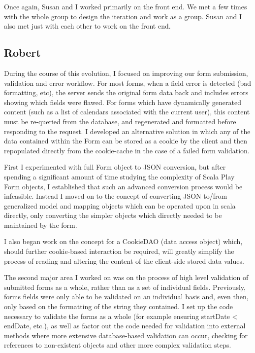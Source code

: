 \documentclass{article}
\begin{document}
Once again, Susan and I worked primarily on the front end.  We met a few times with the whole group to design the iteration and work as a group.  Susan and I also met just with each other to work on the front end.  


\subsection{Robert}
During the course of this evolution, I focused on improving our form submission, validation and error workflow. For most forms, when a field error is detected (bad formatting, etc), the server sends the original form data back and includes errors showing which fields were flawed. For forms which have dynamically generated content (such as a list of calendars associated with the current user), this content must be re-queried from the database, and regenerated and formatted before responding to the request. I developed an alternative solution in which any of the data contained within the Form can be stored as a cookie by the client and then repopulated directly from the cookie-cache in the case of a failed form validation.

First I experimented with full Form object to JSON conversion, but after spending a significant amount of time studying the complexity of Scala Play Form objects, I established that such an advanced conversion process would be infeasible. Instead I moved on to the concept of converting JSON to/from generalized model and mapping objects which can be operated upon in scala directly, only converting the simpler objects which directly needed to be maintained by the form. 

I also began work on the concept for a CookieDAO (data access object) which, should further cookie-based interaction be required, will greatly simplify the process of reading and altering the content of the client-side stored data values. 

The second major area I worked on was on the process of high level validation of submitted forms as a whole, rather than as a set of individual fields. Previously, forms fields were only able to be validated on an individual basis and, even then, only based on the formatting of the string they contained. I set up the code necessary to validate the forms as a whole (for example ensuring startDate < endDate, etc.), as well as factor out the code needed for validation into external methods where more extensive database-based validation can occur, checking for references to non-existent objects and other more complex validation steps.
\end{document}
